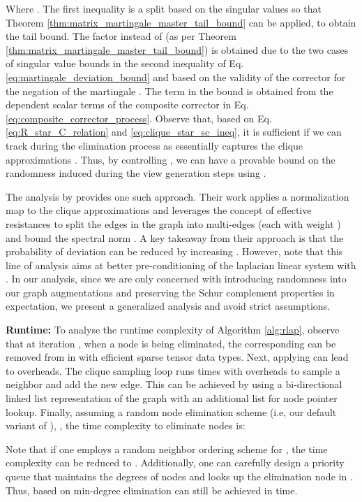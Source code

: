 \documentclass{article}
\theoremstyle{plain}
\theoremstyle{definition}
\theoremstyle{remark}
\begin{document}
Where . The first inequality is a split based on the singular values so that Theorem \ref{thm:matrix_martingale_master_tail_bound} can be applied, to obtain the tail bound. The factor  instead of  (as per Theorem \ref{thm:matrix_martingale_master_tail_bound}) is obtained due to the two cases of singular value bounds in the second inequality of Eq. \ref{eq:martingale_deviation_bound} and based on the validity of the corrector for the negation of the martingale . The  term in the bound is obtained from the  dependent scalar terms of the composite corrector in Eq. \ref{eq:composite_corrector_process}. Observe that, based on Eq. \ref{eq:R_star_C_relation} and \ref{eq:clique_star_sc_ineq}, it is sufficient if we can track  during the elimination process as  essentially captures the clique approximations . Thus, by controlling , we can have a provable bound on the randomness induced during the view generation steps using .  

The analysis by \citet{kyng2016approximate, tropp2019matrix} provides one such approach. Their work applies a normalization map to the clique approximations  and leverages the concept of effective resistances \citep{spielman2008graph} to split the edges in the graph into  multi-edges (each with weight ) and bound the spectral norm . A key takeaway from their approach is that the probability of deviation can be reduced by increasing . However, note that this line of analysis aims at better pre-conditioning of the laplacian linear system with . In our analysis, since we are only concerned with introducing randomness into our graph augmentations and preserving the Schur complement properties in expectation, we present a generalized analysis and avoid strict assumptions.


\textbf{Runtime:} To analyse the runtime complexity of Algorithm \ref{alg:rlap}, observe that at iteration , when a node  is being eliminated, the corresponding  can be removed from  in  with efficient sparse tensor data types. Next, applying  can lead to  overheads. The clique sampling loop runs  times with  overheads to sample a neighbor and add the new edge. This can be achieved by using a bi-directional linked list representation of the graph with an additional list for node pointer lookup. Finally, assuming a random node elimination scheme  (i.e, our default variant of ), , the time complexity to eliminate  nodes is:



Note that if one employs a random neighbor ordering scheme for , the time complexity can be reduced to . Additionally, one can carefully design a priority queue that maintains the degrees of nodes and looks up the elimination node in . Thus,  based on min-degree elimination can still be achieved in  time.
\end{document}
